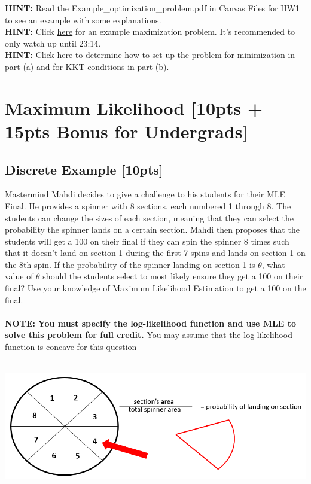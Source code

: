 \documentclass{article}
\begin{document}
\noindent\textbf{HINT:} Read the Example\_optimization\_problem.pdf in Canvas Files for HW1 to see an example with some explanations. \\
\noindent\textbf{HINT:} Click \href{https://www.youtube.com/watch?v=TqN-8fxYUYY}{here} for an example maximization problem. It's recommended to only watch up until 23:14. \\
\noindent\textbf{HINT:} Click \href{https://en.wikipedia.org/wiki/Karush-Kuhn-Tucker_conditions#Nonlinear_optimization_problem}{here} to determine how to set up the problem for minimization in part (a) and for KKT conditions in part (b).\\


\newpage


\section{Maximum Likelihood [10pts + 15pts Bonus for Undergrads]}
\subsection{Discrete Example [10pts]}
Mastermind Mahdi decides to give a challenge to his students for their MLE Final. He provides a spinner with 8 sections, each numbered 1 through 8. The students can change the sizes of each section, meaning that they can select the probability the spinner lands on a certain section. Mahdi then proposes that the students will get a 100 on their final if they can spin the spinner 8 times such that it doesn't land on section 1 during the first 7 spins and lands on section 1 on the 8th spin. If the probability of the spinner landing on section 1 is $\theta$, what value of $\theta$ should the students select to most likely ensure they get a 100 on their final? Use your knowledge of Maximum Likelihood Estimation to get a 100 on the final. \\\\\textbf{NOTE: } \textbf{You must specify the log-likelihood function and use MLE to solve this problem for full credit.} You may assume that the log-likelihood function is concave for this question \\\\

\begin{center}
    \includegraphics[origin=c,scale=.5]{spinner.PNG} 
\end{center}
\end{document}
